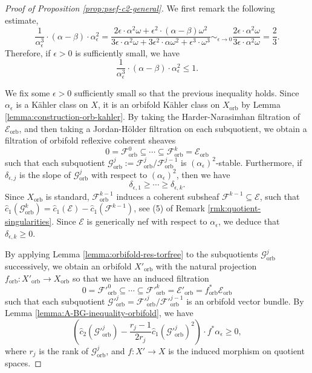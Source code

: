 \documentclass[12pt]{amsart}
\newcommand{\<}{\leq}
\def\>{\geq}
\def\mcE{\mathcal{E}}
\def\mcF{\mathcal{F}}
\def\mcG{\mathcal{G}}
\theoremstyle{remark}
\theoremstyle{definition}
\theoremstyle{definition}
\numberwithin{equation}{section}
\theoremstyle{definition}
\theoremstyle{definition}
\def\orb{\mathrm{orb}}
\begin{document}
\begin{proof}
[{Proof of Proposition \ref{prop:psef-c2-general}}] 
We first remark the following estimate, 
\[
 \frac{1}{\alpha_\epsilon^3} \cdot (\alpha - \beta) \cdot \alpha_\epsilon^{2} 
 = \frac{2 \epsilon \cdot \alpha^{2} \omega + \epsilon^2 \cdot  (\alpha-\beta)\omega^2}{3\epsilon \cdot \alpha^{2}\omega + 3\epsilon^2 \cdot \alpha \omega^2 + \epsilon^3 \cdot \omega^3} 
 \sim_{\epsilon \to 0} \frac{ 2 \epsilon \cdot \alpha^{2} \omega }{3\epsilon \cdot \alpha^{2}\omega} = \frac{2}{3}.
\] 
Therefore, if $\epsilon>0$ is sufficiently small, we have  
\[\frac{1}{\alpha_\epsilon^3} \cdot (\alpha - \beta) \cdot \alpha_\epsilon^{2} \< 1.\]


We fix some $\epsilon>0$   sufficiently small so that the previous inequality holds.
Since $\alpha_\epsilon$ is a K\"ahler class on $X$, it is  an orbifold K\"ahler class on $X_{\orb}$ by Lemma \ref{lemma:construction-orb-kahler}. 
By taking the Harder-Narasimhan filtration of $\mcE_{\orb}$, and then taking a Jordan-H\"older filtration on each subquotient, we obtain  a  filtration of  orbifold reflexive coherent sheaves
\[ 0 = \mcF^0_{\orb} \subseteq  \cdots \subseteq \mcF^k_{\orb} = \mcE_{\orb} \]
such that each subquotient $\mcG^j_{\orb}:=\mcF^j_{\orb}/\mcF^{j-1}_{\orb}$ is $(\alpha_\epsilon)^{2}$-stable. 
Furthermore, if $\delta_{\epsilon,j}$ is the slope of $\mcG_{\orb}^j$ with respect to $(\alpha_\epsilon)^{2}$, then we have
\[
\delta_{\epsilon,1} \> \cdots \> \delta_{\epsilon, k}.
\]
Since $X_{\orb}$ is standard, $\mcF^{k-1}_\orb$ induces a coherent  subsheaf $\mcF^{k-1}\subseteq \mcE$, such that $\hat{c}_1(\mcG_{\orb}^k) = \hat{c}_1(\mcE) - \hat{c}_1(\mcF^{k-1})$, see (5) of Remark \ref{rmk:quotient-singularities}. 
Since $\mcE$ is generically nef with respect to $\alpha_\epsilon$, we deduce that $\delta_{\epsilon,k} \> 0$.  

By applying Lemma \ref{lemma:orbifold-res-torfree} to the subquotients $\mcG^j_\orb$ successively, we obtain  an orbifold $X'_{\orb}$ with the natural projection  $f_{\orb}\colon  X'_{\orb} \to X_{\orb}$  so that
we have an induced filtration
\[ 0 = \mcF'^0_{\orb} \subseteq  \cdots \subseteq  \mcF'^k_{\orb} = \mcE'_{\orb} = f_{\orb}^*\mcE_{\orb}\]
such that each  subquotient $\mcG'^j_{\orb} = \mcF'^j_{\orb}/\mcF'^{j-1}_{\orb}$ is  an orbifold vector bundle. 
By Lemma \ref{lemma:A-BG-inequality-orbifold}, we have 
\[  
\left(\hat{c}_2(\mcG'^j_{\orb}) - \frac{r_j-1}{2r_j}\hat{c}_1(\mcG'^j_{\orb} )^2 \right) \cdot f^*\alpha_\epsilon\> 0, 
\] 
where  $r_j$ is the rank of $\mcG^j_{\orb}$, and $f\colon X'\to X$ is the induced morphism on quotient spaces. 



\end{proof}
\end{document}
